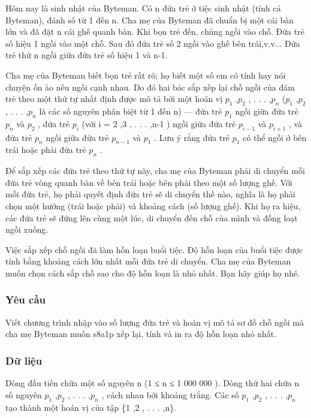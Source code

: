 



   Hôm nay là sinh nhật của Byteman. Có n đứa trẻ ở tiệc sinh nhật (tính cả Byteman), đánh số từ 1 đến n. Cha mẹ của Byteman đã chuẩn bị một cái bàn lớn và đã đặt n cái ghế quanh bàn. Khi bọn trẻ đến, chúng ngồi vào chỗ. Đứa trẻ số hiệu 1 ngồi vào một chỗ. Sau đó đứa trẻ số 2 ngồi vào ghế bên trái,v.v... Đứa trẻ thứ n ngồi giữa đứa trẻ số hiệu 1 và n-1.  

   Cha mẹ của Byteman biết bọn trẻ rất rõ; họ biết một số em có tính hay nói chuyện ồn ào nếu ngồi cạnh nhau. Do đó hai bác sắp xếp lại chỗ ngồi của đám trẻ theo một thứ tự nhất định được mô tả bởi một hoán vị $p_{1}$   ,$p_{2}$   , . . . ,$p_{n}$   ($p_{1}$   ,$p_{2}$   , . . . ,$p_{n}$   là các số nguyên phân biệt từ 1 đến n) — đứa trẻ $p_{1}$   ngồi giữa đứa trẻ $p_{n}$   và $p_{2}$   , đứa trẻ $p_{i}$   (với i = 2 ,3 , . . . ,n-1 ) ngồi giữa đứa trẻ $p_{i-1}$   và $p_{i+1}$   , và đứa trẻ $p_{n}$   ngồi giữa đứa trẻ $p_{n-1}$   và $p_{1}$   . Lưu ý rằng đứa trẻ $p_{1}$   có thể ngồi ở bên trái hoặc phải đứa trẻ $p_{n}$   .  

   Để sắp xếp các đứa trẻ theo thứ tự này, cha mẹ của Byteman phải di chuyển mỗi đứa trẻ vòng quanh bàn về bên trái hoặc bên phải theo một số lượng ghế. Với mỗi đứa trẻ, họ phải quyết định đứa trẻ sẽ di chuyển thế nào, nghĩa là họ phải chọn một hướng (trái hoặc phải) và khoảng cách (số lượng ghế). Khi họ ra hiệu, các đứa trẻ sẽ đứng lên cùng một lúc, di chuyển đến chỗ của mình và đồng loạt ngồi xuống.  

   Việc sắp xếp chỗ ngồi đã làm hỗn loạn buổi tiệc. Độ hỗn loạn của buổi tiệc được tính bằng khoảng cách lớn nhất mỗi đứa trẻ di chuyển. Cha mẹ của Byteman muốn chọn cách sắp chỗ sao cho độ hỗn loạn là nhỏ nhất. Bạn hãy giúp họ nhé.  

\subsubsection{   Yêu cầu  }

   Viết chương trình nhập vào số lượng đứa trẻ và hoán vị mô tả sơ đồ chỗ ngồi mà cha mẹ Byteman muốn s8a1p xếp lại, tính và in ra độ hỗn loạn nhỏ nhất.  

\subsubsection{   Dữ liệu  }

   Dòng đầu tiến chứa một số nguyên n (1 ≤ n ≤ 1 000 000 ). Dòng thứ hai chứa n số nguyên $p_{1}$   ,$p_{2}$   , . . . ,$p_{n}$   , cách nhau bởi khoảng trắng. Các số $p_{1}$   ,$p_{2}$   , . . . ,$p_{n}$   tạo thành một hoán vị của tập \{1 ,2 , . . . ,n\}.  

